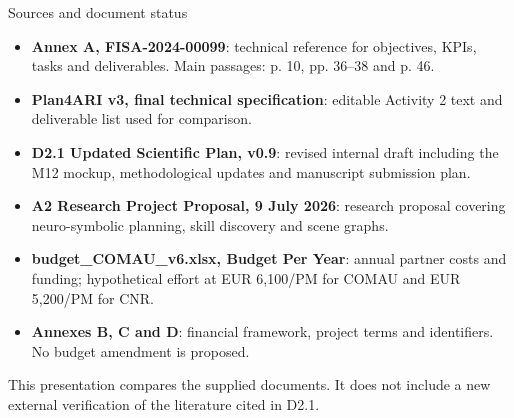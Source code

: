 \documentclass[aspectratio=169,10pt]{beamer}
\begin{document}
\begin{frame}{Sources and document status}
\small
\begin{itemize}\setlength{\itemsep}{2pt}
\item \textbf{Annex A, FISA-2024-00099}: technical reference for objectives, KPIs, tasks and deliverables. Main passages: p. 10, pp. 36--38 and p. 46.
\item \textbf{Plan4ARI v3, final technical specification}: editable Activity 2 text and deliverable list used for comparison.
\item \textbf{D2.1 Updated Scientific Plan, v0.9}: revised internal draft including the M12 mockup, methodological updates and manuscript submission plan.
\item \textbf{A2 Research Project Proposal, 9 July 2026}: research proposal covering neuro-symbolic planning, skill discovery and scene graphs.
\item \textbf{budget\_COMAU\_v6.xlsx, Budget Per Year}: annual partner costs and funding; hypothetical effort at EUR 6,100/PM for COMAU and EUR 5,200/PM for CNR.
\item \textbf{Annexes B, C and D}: financial framework, project terms and identifiers. No budget amendment is proposed.
\end{itemize}
\medskip
This presentation compares the supplied documents. It does not include a new external verification of the literature cited in D2.1.
\end{frame}
\end{document}
